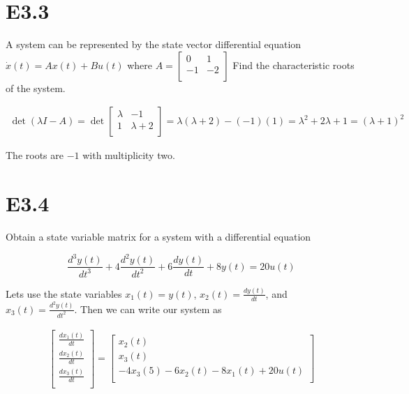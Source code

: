 \documentclass[11pt]{article}
\begin{document}
\section{E3.3}

A system can be represented by the state vector differential equation $\dot x(t) = Ax(t) + Bu(t)$ where $A = \begin{bmatrix} 0 & 1 \\ -1 & -2 \\ \end{bmatrix}$ Find the characteristic roots of the system.

\begin{align*}
    \det(\lambda I - A) = \det \begin{bmatrix}
        \lambda & -1 \\
        1 & \lambda + 2 \\
    \end{bmatrix}
    = \lambda (\lambda + 2) - (-1) (1) = \lambda^2 + 2 \lambda + 1 = (\lambda + 1)^2
\end{align*}

The roots are $-1$ with multiplicity two.

\section{E3.4}

Obtain a state variable matrix for a system with a differential equation

\[ \dfrac{d^3 y(t)}{dt^3} + 4 \dfrac{d^2 y(t)}{dt^2} + 6 \dfrac{dy(t)}{dt} + 8 y(t) = 20 u(t) \]

Lets use the state variables $x_1(t) = y(t)$, $x_2(t) = \frac{dy(t)}{dt}$, and $x_3(t) = \frac{d^2 y(t)}{dt^2}$. Then we can write our system as

\begin{align*}
    \begin{bmatrix}
        \frac{d x_1(t)}{dt} \\
        \frac{d x_2(t)}{dt} \\
        \frac{d x_3(t)}{dt} \\
    \end{bmatrix}
    =
    \begin{bmatrix}
        x_2(t) \\
        x_3(t) \\
        -4 x_3(5) - 6 x_2(t) - 8 x_1(t) + 20 u(t) \\
    \end{bmatrix}
\end{align*}
\end{document}
